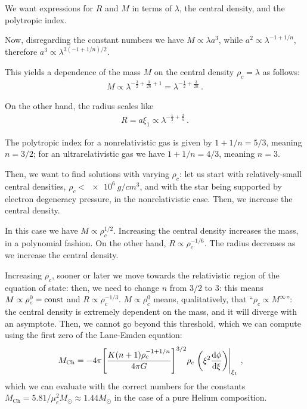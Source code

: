 \documentclass[main.tex]{subfiles}
\begin{document}
We want expressions for \(R\) and \(M\) in terms of \(\lambda \), the central density, and the polytropic index. 

Now, disregarding the constant numbers we have \(M \propto \lambda a^3\), while \(a^2 \propto \lambda^{-1 + 1/n}\), therefore \(a^3 \propto \lambda^{3 (-1 + 1/n) /2}\). 

This yields a dependence of the mass \(M\) on the central density \(\rho _c = \lambda \) as follows: 
%
\begin{align}
M \propto \lambda^{- \frac{3}{2} + \frac{3}{2n} + 1} = \lambda^{- \frac{1}{2} + \frac{3}{2n}}
\,.
\end{align}

On the other hand, the radius scales like 
%
\begin{align}
R = a \xi_1 \propto \lambda^{- \frac{1}{2} + \frac{2}{n}}
\,.
\end{align}

The polytropic index for a nonrelativistic gas is given by \(1 + 1/n = 5/3\), meaning \(n = 3/2\); for an ultrarelativistic gas we have \(1 + 1/n = 4/3\), meaning \(n = 3\). 

Then, we want to find solutions with varying \(\rho _c\): let us start with relatively-small central densities, \(\rho _c < \SI{e6}{g / cm^3}\), and with the star being supported by electron degeneracy pressure, in the nonrelativistic case.
Then, we increase the central density. 

In this case we have \(M \propto \rho _c^{1/2}\). Increasing the central density increases the mass, in a polynomial fashion. 
On the other hand, \(R \propto \rho _c^{- 1/6}\). The radius decreases as we increase the central density. 

Increasing \(\rho _c\), sooner or later we move towards the relativistic region of the equation of state: then, we need to change \(n\) from \(3/2\) to \(3\): this means \(M \propto \rho _c^{0} = \text{const}\) and \(R \propto \rho _c^{- 1/3}\). \(M \propto \rho _c^{0}\) means, qualitatively,  that ``\(\rho _c \propto M^{\infty }\)'': the central density is extremely dependent on the mass, and it will diverge with an asymptote. 
Then, we cannot go beyond this threshold, which we can compute using the first zero of the Lane-Emden equation: 
%
\begin{align}
M _{\text{Ch}} &= - 4 \pi \qty[\frac{K (n+1) \rho _c^{-1 + 1/n}}{4 \pi G}]^{3/2} \rho _c \eval{\qty(\xi^2 \dv{\phi }{\xi })}_{\xi_1 }
\,,
\end{align}
%
which we can evaluate with the correct numbers for the constants \(M _{\text{Ch}} = \num{5.81} / \mu _e^2 M_{\odot} \approx \num{1.44} M_{\odot}\) in the case of a pure Helium composition. 

\end{document}
